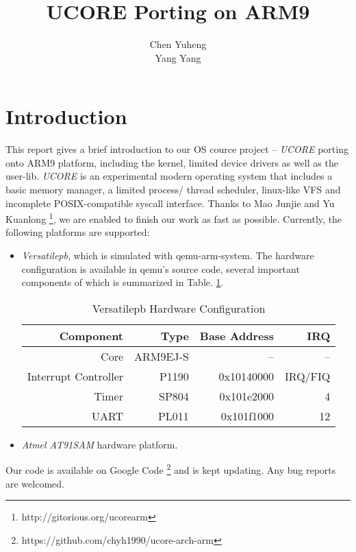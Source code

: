 \documentclass[a4paper]{article}
\begin{document}
\title{UCORE Porting on ARM9}
\author{Chen Yuheng \\ Yang Yang}
\maketitle

\section{Introduction}
This report gives a brief introduction to our OS cource project -- 
\emph{UCORE} porting onto ARM9 platform, including the kernel, limited
device drivers as well as the user-lib. \emph{UCORE} is an experimental 
modern operating system that includes a basic memory manager, a limited process/
thread scheduler, linux-like VFS and incomplete POSIX-compatible syscall 
interface. Thanks to Mao Junjie
 and Yu Kuanlong
\footnote{http://gitorious.org/ucorearm}, we are enabled to finish our
 work as fast as possible. Currently, the following platforms are supported:
 \begin{itemize}
   \item \emph{Versatilepb}, which is simulated with qemu-arm-system.
     The hardware configuration is available in qemu's source code,
     several important components of which is summarized in
     Table. \ref{tab:versatile1}.
     \begin{table}[h]
       \centering
       \begin{tabular}{|r|rrr|}
         \hline
         Component & Type & Base Address &  IRQ \\
         \hline
         Core     &  ARM9EJ-S & -- & -- \\
         Interrupt Controller & P1190 & 0x10140000 & IRQ/FIQ \\
         Timer    &  SP804    & 0x101e2000 & 4 \\
         UART     &  PL011  & 0x101f1000 & 12  \\
         \hline
       \end{tabular}
       \caption{Versatilepb Hardware Configuration}
       \label{tab:versatile1}
     \end{table}

   \item \emph{Atmel AT91SAM} hardware platform.
 \end{itemize}

Our code is available on Google Code
\footnote{https://github.com/chyh1990/ucore-arch-arm}
 and is kept updating. Any bug reports are welcomed.
\end{document}
